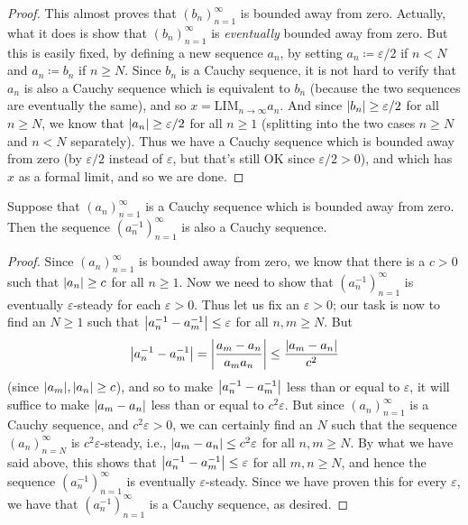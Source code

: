 \begin{proof}
  This almost proves that \((b_n)_{n = 1}^{\infty}\) is bounded away from zero.
  Actually, what it does is show that \((b_n)_{n = 1}^{\infty}\) is \emph{eventually} bounded away from zero.
  But this is easily fixed, by defining a new sequence \(a_n\), by setting \(a_n \coloneqq \varepsilon / 2\) if \(n < N\) and \(a_n \coloneqq b_n\) if \(n \geq N\).
  Since \(b_n\) is a Cauchy sequence, it is not hard to verify that \(a_n\) is also a Cauchy sequence which is equivalent to \(b_n\) (because the two sequences are eventually the same), and so \(x = \text{LIM}_{n \to \infty} a_n\).
  And since \(\left\lvert b_n\right\rvert \geq \varepsilon / 2\) for all \(n \geq N\), we know that \(\left\lvert a_n\right\rvert \geq \varepsilon / 2\) for all \(n \geq 1\) (splitting into the two cases \(n \geq N\) and \(n < N\) separately).
  Thus we have a Cauchy sequence which is bounded away from zero (by \(\varepsilon / 2\) instead of \(\varepsilon\), but that's still OK since \(\varepsilon / 2 > 0\)), and which has \(x\) as a formal limit, and so we are done.
\end{proof}

\begin{lemma}\label{5.3.15}
  Suppose that \((a_n)_{n = 1}^{\infty}\) is a Cauchy sequence which is bounded away from zero.
  Then the sequence \((a_n^{-1})_{n = 1}^{\infty}\) is also a Cauchy sequence.
\end{lemma}

\begin{proof}
  Since \((a_n)_{n = 1}^{\infty}\) is bounded away from zero, we know that there is a \(c > 0\) such that \(\left\lvert a_n\right\rvert \geq c\) for all \(n \geq 1\).
  Now we need to show that \((a_n^{-1})_{n = 1}^{\infty}\) is eventually \(\varepsilon\)-steady for each \(\varepsilon > 0\).
  Thus let us fix an \(\varepsilon > 0\);
  our task is now to find an \(N \geq 1\) such that \(\left\lvert a_n^{-1} - a_m^{-1}\right\rvert \leq \varepsilon\) for all \(n, m \geq N\).
  But
  \[
    \left\lvert a_n^{-1} - a_m^{-1}\right\rvert = \left\lvert\frac{a_m - a_n}{a_m a_n}\right\rvert \leq \frac{\left\lvert a_m - a_n\right\rvert}{c^2}
  \]
  (since \(\abs{a_m}, \abs{a_n} \geq c\)), and so to make \(\left\lvert a_n^{-1} - a_m^{-1}\right\rvert\) less than or equal to \(\varepsilon\), it will suffice to make \(\left\lvert a_m - a_n\right\rvert\) less than or equal to \(c^2 \varepsilon\).
  But since \((a_n)_{n = 1}^{\infty}\) is a Cauchy sequence, and \(c^2 \varepsilon > 0\), we can certainly find an \(N\) such that the sequence \((a_n)_{n = N}^{\infty}\) is \(c^2 \varepsilon\)-steady, i.e., \(\left\lvert a_m - a_n\right\rvert \leq c^2 \varepsilon\) for all \(n, m \geq N\).
  By what we have said above, this shows that \(\left\lvert a_n^{-1} - a_m^{-1}\right\rvert \leq \varepsilon\) for all \(m, n \geq N\), and hence the sequence \((a_n^{-1})_{n = 1}^{\infty}\) is eventually \(\varepsilon\)-steady.
  Since we have proven this for every \(\varepsilon\), we have that \((a_n^{-1})_{n = 1}^{\infty}\) is a Cauchy sequence, as desired.
\end{proof}

